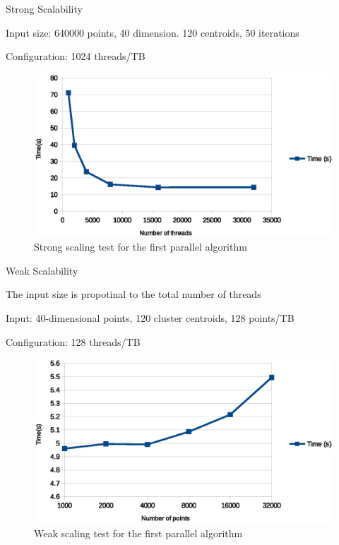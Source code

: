 \documentclass[
nopagebreaks,
style=klope,
fleqn]{powerdot}
\begin{document}
\begin{slide}{Strong Scalability}
  \begin{compactitem}
  \item{Input size: 640000 points, 40 dimension. 120 centroids, 50 iterations}
  \item{Configuration: 1024 threads/TB}
  \end{compactitem}
  \begin{figure}[!h]
    \centering
    \includegraphics[width=0.7\linewidth]{fig/strong_scaling}
    \caption{Strong scaling test for the first parallel algorithm}
    \label{fig:strong_scaling}
  \end{figure}
\end{slide}

\begin{slide}{Weak Scalability}
  \begin{compactitem}
  \item{The input size is propotinal to the total number of threads}
  \item{Input: 40-dimensional points, 120 cluster centroids, 128 points/TB}
  \item{Configuration: 128 threads/TB}
  \end{compactitem}
  \begin{figure}[!h]
    \centering
    \includegraphics[width=0.7\linewidth]{fig/weak_scaling}
    \caption{Weak scaling test for the first parallel algorithm}
    \label{fig:weak_scaling}
  \end{figure}
\end{slide}
\end{document}
